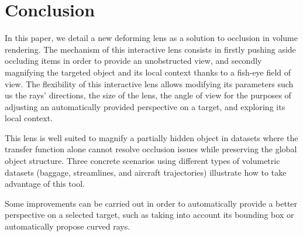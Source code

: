 \section{Conclusion}

In this paper, we detail a new deforming lens as a solution to occlusion in volume rendering. The mechanism of this interactive lens consists in firstly pushing aside occluding items in order to provide an unobstructed view, and secondly magnifying the targeted object and its local context thanks to a fish-eye field of view. The flexibility of this interactive lens allows modifying its parameters such us the rays' directions, the size of the lens, the angle of view for the purposes of adjusting an automatically provided perspective on a target, and exploring its local context. 

This lens is well suited to magnify a partially hidden object in datasets where the transfer function alone cannot resolve occlusion issues while preserving the global object structure. Three concrete scenarios using different types of volumetric datasets (baggage, streamlines, and aircraft trajectories) illustrate how to take advantage of this tool.

Some improvements can be carried out in order to automatically provide a better perspective on a selected target, such as taking into account its bounding box or automatically propose curved rays.